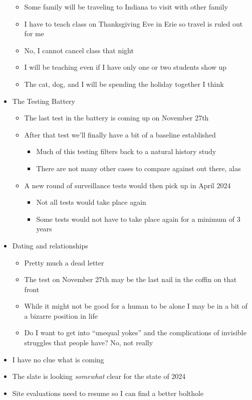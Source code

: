 \begin{itemize}
  \begin{itemize}
  \tightlist
  \item
    Some family will be traveling to Indiana to visit with other family
  \item
    I have to teach class on Thanksgiving Eve in Erie so travel is ruled
    out for me
  \item
    No, I cannot cancel class that night
  \item
    I will be teaching even if I have only one or two students show up
  \item
    The cat, dog, and I will be spending the holiday together I think
  \end{itemize}
\item
  The Testing Battery

  \begin{itemize}
  \tightlist
  \item
    The last test in the battery is coming up on November 27th
  \item
    After that test we'll finally have a bit of a baseline established

    \begin{itemize}
    \tightlist
    \item
      Much of this testing filters back to a natural history study
    \item
      There are not many other cases to compare against out there, alas
    \end{itemize}
  \item
    A new round of surveillance tests would then pick up in April 2024

    \begin{itemize}
    \tightlist
    \item
      Not all tests would take place again
    \item
      Some tests would not have to take place again for a minimum of 3
      years
    \end{itemize}
  \end{itemize}
\item
  Dating and relationships

  \begin{itemize}
  \tightlist
  \item
    Pretty much a dead letter
  \item
    The test on November 27th may be the last nail in the coffin on that
    front
  \item
    While it might not be good for a human to be alone I may be in a bit
    of a bizarre position in life
  \item
    Do I want to get into ``unequal yokes'' and the complications of
    invisible struggles that people have? No, not really
  \end{itemize}
\item
  I have no clue what is coming
\item
  The slate is looking \emph{somewhat} clear for the state of 2024
\item
  Site evaluations need to resume so I can find a better bolthole


\end{itemize}
